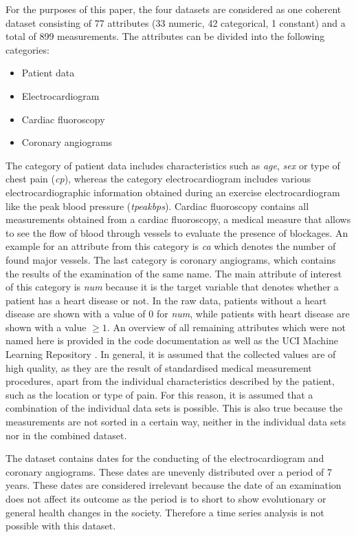 For the purposes of this paper, the four datasets are considered as one coherent dataset consisting of 77 attributes (33 numeric, 42 categorical, 1 constant) and a total of 899 measurements.
The attributes can be divided into the following categories:
\begin{multicols}{2}
    \begin{itemize}
        \item Patient data
        \item Electrocardiogram
        \item Cardiac fluoroscopy
        \item Coronary angiograms
    \end{itemize}
\end{multicols}
The category of patient data includes characteristics such as \textit{age}, \textit{sex} or type of chest pain (\textit{cp}), whereas the category electrocardiogram includes various electrocardiographic information obtained during an exercise electrocardiogram like the peak blood pressure (\textit{tpeakbps}). Cardiac fluoroscopy contains all measurements obtained from a cardiac fluoroscopy, a medical measure that allows to see the flow of blood through vessels to evaluate the presence of blockages. An example for an attribute from this category is \textit{ca} which denotes the number of found major vessels. The last category is coronary angiograms, which contains the results of the examination of the same name. The main attribute of interest of this category is \textit{num} because it is the target variable that denotes whether a patient has a heart disease or not. In the raw data, patients without a heart disease are shown with a value of 0 for \textit{num}, while patients with heart disease are shown with a value  $\geq 1$.
An overview of all remaining attributes which were not named here is provided in the code documentation as well as the UCI Machine Learning Repository \citep{janosi1988}. In general, it is assumed that the collected values are of high quality, as they are the result of standardised medical measurement procedures, apart from the individual characteristics described by the patient, such as the location or type of pain. For this reason, it is assumed that a combination of the individual data sets is possible. This is also true because the measurements are not sorted in a certain way, neither in the individual data sets nor in the combined dataset.

The dataset contains dates for the conducting of the electrocardiogram and coronary angiograms. These dates are unevenly distributed over a period of 7 years. These dates are considered irrelevant because the date of an examination does not affect its outcome as the period is to short to show evolutionary or general health changes in the society. Therefore a time series analysis is not possible with this dataset.

